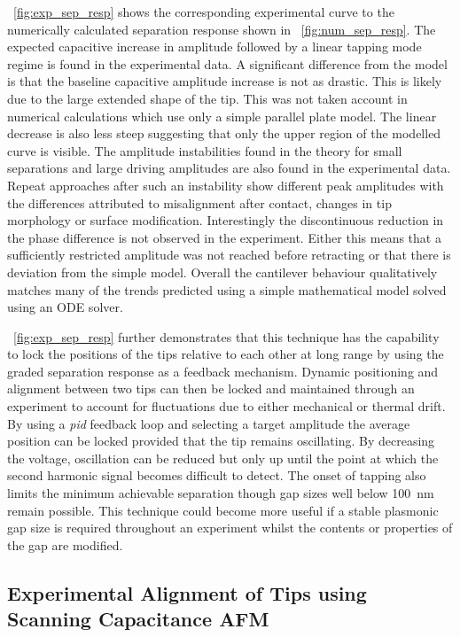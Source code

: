\documentclass{article}
\begin{document}
\figurename~\ref{fig:exp_sep_resp} shows the corresponding experimental curve to the numerically calculated separation response shown in \figurename~\ref{fig:num_sep_resp}. The expected capacitive increase in amplitude followed by a linear tapping mode regime is found in the experimental data. A significant difference from the model is that the baseline capacitive amplitude increase is not as drastic. This is likely due to the large extended shape of the tip. This was not taken account in numerical calculations which use only a simple parallel plate model. The linear decrease is also less steep suggesting that only the upper region of the modelled curve is visible.
The amplitude instabilities found in the theory for small separations and large driving amplitudes are also found in the experimental data. Repeat approaches after such an instability show different peak amplitudes with the differences attributed to misalignment after contact, changes in tip morphology or surface modification.
Interestingly the discontinuous reduction in the phase difference is not observed in the experiment. Either this means that a sufficiently restricted amplitude was not reached before retracting or that there is deviation from the simple model.
Overall the cantilever behaviour qualitatively matches many of the trends predicted using a simple mathematical model solved using an ODE solver.

\figurename~\ref{fig:exp_sep_resp} further demonstrates that this technique has the capability to lock the positions of the tips relative to each other at long range by using the graded separation response as a feedback mechanism. Dynamic positioning and alignment between two tips can then be locked and maintained through an experiment to account for fluctuations due to either mechanical or thermal drift. By using a \textit{pid} feedback loop and selecting a target amplitude the average position can be locked provided that the tip remains oscillating. By decreasing the voltage, oscillation can be reduced but only up until the point at which the second harmonic signal becomes difficult to detect. The onset of tapping also limits the minimum achievable separation though gap sizes well below \SI{100}{nm} remain possible. This technique could become more useful if a stable plasmonic gap size is required throughout an experiment whilst the contents or properties of the gap are modified.

\FloatBarrier
\subsection{Experimental Alignment of Tips using Scanning Capacitance AFM}
\end{document}

